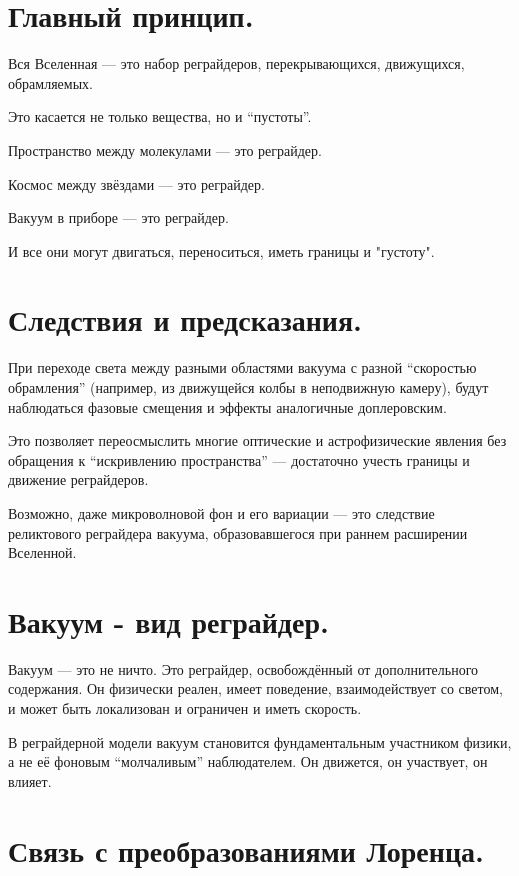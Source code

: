 \documentclass[12pt]{article}
\begin{document}
\section*{Главный принцип.}

Вся Вселенная — это набор реграйдеров, перекрывающихся, движущихся, обрамляемых.

Это касается не только вещества, но и “пустоты”.

Пространство между молекулами — это реграйдер.

Космос между звёздами — это реграйдер.

Вакуум в приборе — это реграйдер.

И все они могут двигаться, переноситься, иметь границы и "густоту".

\section*{Следствия и предсказания.}

При переходе света между разными областями вакуума с разной “скоростью обрамления” (например, из движущейся колбы в неподвижную камеру), будут наблюдаться фазовые смещения и эффекты аналогичные доплеровским.

Это позволяет переосмыслить многие оптические и астрофизические явления без обращения к “искривлению пространства” — достаточно учесть границы и движение реграйдеров.

Возможно, даже микроволновой фон и его вариации — это следствие реликтового реграйдера вакуума, образовавшегося при раннем расширении Вселенной.

\section*{Вакуум - вид реграйдер.}

Вакуум — это не ничто. Это реграйдер, освобождённый от дополнительного содержания. Он физически реален, имеет поведение, взаимодействует со светом, и может быть локализован и ограничен и иметь скорость.

В реграйдерной модели вакуум становится фундаментальным участником физики, а не её фоновым “молчаливым” наблюдателем. Он движется, он участвует, он влияет.

\section*{Связь с преобразованиями Лоренца.}
\end{document}
